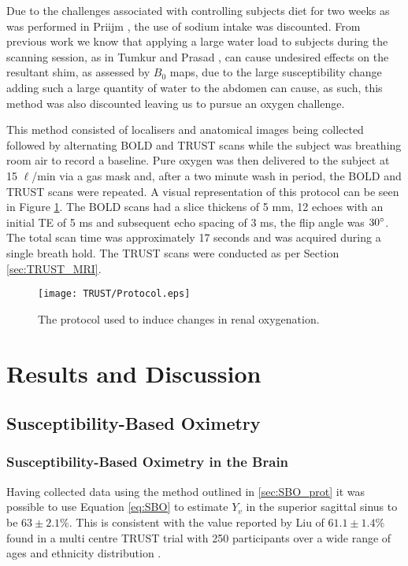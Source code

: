 Due to the challenges associated with controlling subjects diet for two weeks as was performed in Priijm \cite{pruijm_effect_2010}, the use of sodium intake was discounted. From previous work we know that applying a large water load to subjects during the scanning session, as in Tumkur and Prasad  \cite{tumkur_evaluation_2006, prasad_changes_1999}, can cause undesired effects on the resultant shim, as assessed by $B_0$ maps, due to the large susceptibility change adding such a large quantity of water to the abdomen can cause, as such, this method was also discounted leaving us to pursue an oxygen challenge.

This method consisted of localisers and anatomical images being collected followed by alternating \ac{BOLD} \ttwostar and \ac{TRUST} scans while the subject was breathing room air to record a baseline. Pure oxygen was then delivered to the subject at 15 $\ell$/min via a gas mask and, after a two minute wash in period, the \ac{BOLD} \ttwostar and \ac{TRUST} scans were repeated. A visual representation of this protocol can be seen in Figure \ref{fig:oxygen_challenge_protocol}. The \ac{BOLD} \ttwostar scans had a slice thickens of 5 mm, 12 echoes with an initial \ac{TE} of 5 ms and subsequent echo spacing of 3 ms, the flip angle was $30\degree$. The total scan time was approximately 17 seconds and was acquired during a single breath hold. The \ac{TRUST} scans were conducted as per Section \ref{sec:TRUST_MRI}.

\begin{figure}[H]
	\centering
	\texttt{[image: TRUST/Protocol.eps]}
	\caption{The protocol used to induce changes in renal oxygenation.}
	\label{fig:oxygen_challenge_protocol}	
\end{figure}

\newpage
\section{Results and Discussion}
\subsection{Susceptibility-Based Oximetry}
\subsubsection{Susceptibility-Based Oximetry in the Brain}

Having collected data using the method outlined in \ref{sec:SBO_prot} it was possible to use Equation \eqref{eq:SBO} to estimate $Y_v$ in the superior sagittal sinus to be $63\pm2.1\%$. This is consistent with the value reported by Liu of $61.1\pm1.4\%$ found in a multi centre \ac{TRUST} trial with 250 participants over a wide range of ages and ethnicity distribution \cite{liu_multi-site_2016}.


